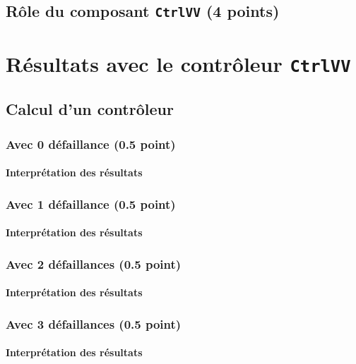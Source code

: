 \documentclass[a4paper]{book}
\begin{document}
\subsection{Rôle du composant {\tt CtrlVV} (4 points)}

\section{Résultats avec le contrôleur {\tt CtrlVV}}
\subsection{Calcul d'un contrôleur}
\subsubsection{Avec 0 défaillance (0.5 point)}

\paragraph{Interprétation des résultats}

\subsubsection{Avec 1 défaillance (0.5 point)}

\paragraph{Interprétation des résultats}

\subsubsection{Avec 2 défaillances (0.5 point)}

\paragraph{Interprétation des résultats}

\subsubsection{Avec 3 défaillances (0.5 point)}

\paragraph{Interprétation des résultats}
\end{document}

